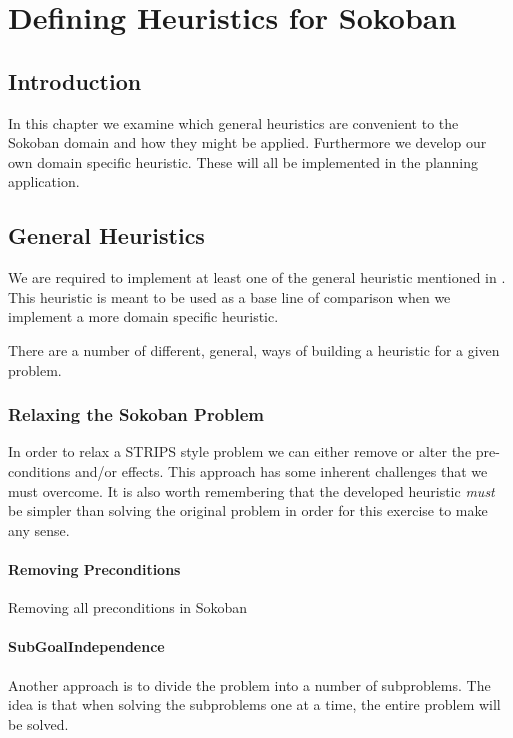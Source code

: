 \chapter{Defining Heuristics for Sokoban}
\label{cha:heuristics}

\section{Introduction}
In this chapter we examine which general heuristics are convenient to
the Sokoban domain and how they might be applied. Furthermore we
develop our own domain specific heuristic. These will all be
implemented in the planning application.

\section{General Heuristics}
We are required to implement at least one of the general heuristic
mentioned in \citet{Russell2003GeneralHeuristics}. This heuristic is
meant to be used as a base line of comparison when we implement a more
domain specific heuristic.

There are a number of different, general, ways of building a heuristic
for a given problem. 

\subsection{Relaxing the Sokoban Problem}
In order to relax a STRIPS style problem we can either remove or alter
the pre-conditions and/or effects. This approach has some inherent
challenges that we must overcome. It is also worth remembering that
the developed heuristic \emph{must} be simpler than solving the
original problem in order for this exercise to make any sense.

\subsubsection{Removing Preconditions}

Removing all preconditions in Sokoban 

\subsubsection{SubGoalIndependence}
Another approach is to divide the problem into a number of subproblems. The idea is that when solving the subproblems one at a time, the entire problem will be solved.


